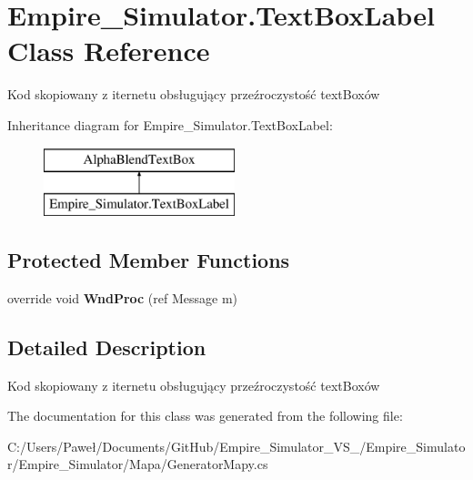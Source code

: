 \hypertarget{class_empire___simulator_1_1_text_box_label}{\section{Empire\+\_\+\+Simulator.\+Text\+Box\+Label Class Reference}
\label{class_empire___simulator_1_1_text_box_label}
}


Kod skopiowany z iternetu obsługujący przeźroczystość text\+Boxów  


Inheritance diagram for Empire\+\_\+\+Simulator.\+Text\+Box\+Label\+:\begin{figure}[H]
\begin{center}
\leavevmode
\includegraphics[height=2.000000cm]{class_empire___simulator_1_1_text_box_label}
\end{center}
\end{figure}
\subsection*{Protected Member Functions}
\begin{DoxyCompactItemize}
\item 
\hypertarget{class_empire___simulator_1_1_text_box_label_ab9210551caa97acc31317d77142c6418}{override void {\bfseries Wnd\+Proc} (ref Message m)}\label{class_empire___simulator_1_1_text_box_label_ab9210551caa97acc31317d77142c6418}

\end{DoxyCompactItemize}


\subsection{Detailed Description}
Kod skopiowany z iternetu obsługujący przeźroczystość text\+Boxów 



The documentation for this class was generated from the following file\+:\begin{DoxyCompactItemize}
\item 
C\+:/\+Users/\+Paweł/\+Documents/\+Git\+Hub/\+Empire\+\_\+\+Simulator\+\_\+\+V\+S\+\_/\+Empire\+\_\+\+Simulator/\+Empire\+\_\+\+Simulator/\+Mapa/Generator\+Mapy.\+cs\end{DoxyCompactItemize}
